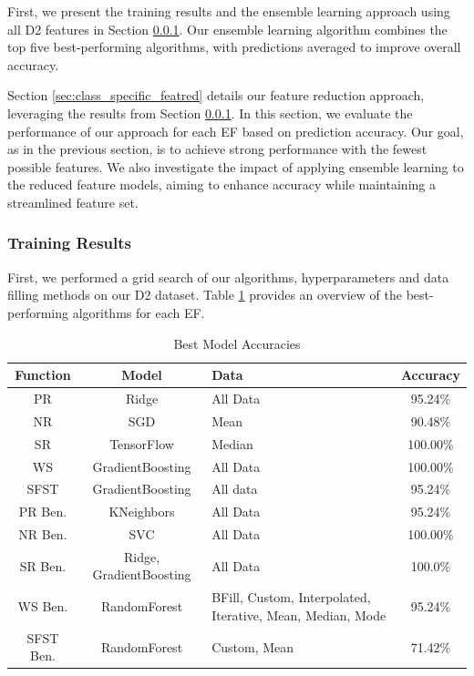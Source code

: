 \documentclass[12pt,letterpaper]{article}
\begin{document}
First, we present the training results and the ensemble learning approach using all D2 features in Section \ref{sec:class_specific_results}.
Our ensemble learning algorithm combines the top five best-performing algorithms, with predictions averaged to improve overall accuracy.

Section \ref{sec:class_specific_featred} details our feature reduction approach, leveraging the results from Section \ref{sec:class_specific_results}.
In this section, we evaluate the performance of our approach for each \ac{EF} based on prediction accuracy.
Our goal, as in the previous section, is to achieve strong performance with the fewest possible features.
We also investigate the impact of applying ensemble learning to the reduced feature models, aiming to enhance accuracy while maintaining a streamlined feature set.



\subsubsection{Training Results}\label{sec:class_specific_results}
First, we performed a grid search of our algorithms, hyperparameters and data filling methods on our D2 dataset.
Table \ref{tab_class_specific:model_accuracies_best} provides an overview of the best-performing algorithms for each \ac{EF}.

\begin{table}[H]
\centering
\begin{tabular}{|c|c|p{4cm}|c|}
\hline
\textbf{Function} & \textbf{Model} & \textbf{Data} & \textbf{Accuracy} \\
\hline
PR & Ridge & All Data & 95.24\% \\
\hline
NR    & SGD & Mean & 90.48\% \\
\hline
SR    & TensorFlow & Median & 100.00\% \\
\hline
WS    & GradientBoosting & All Data & 100.00\% \\
\hline
SFST  & GradientBoosting & All data & 95.24\% \\
\hline
PR Ben. & KNeighbors & All Data & 95.24\% \\
\hline
NR Ben. & SVC & All Data & 100.00\% \\
\hline
SR Ben.& Ridge, GradientBoosting & All Data & 100.0\% \\
\hline
WS Ben. & RandomForest & BFill, Custom, Interpolated, Iterative, Mean, Median, Mode & 95.24\% \\
\hline
SFST Ben. &  RandomForest & Custom, Mean & 71.42\% \\
\hline
\end{tabular}
\caption{Best Model Accuracies}
\label{tab_class_specific:model_accuracies_best}
\end{table}
\end{document}
